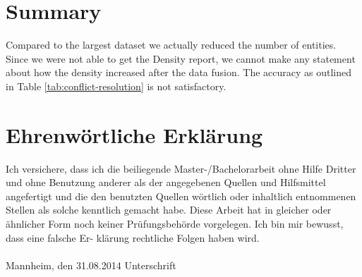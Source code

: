 \documentclass[11pt,titlepage,oneside,openany]{article}
\begin{document}
\section{Summary}
Compared to the largest dataset we actually reduced the number of entities. Since we were not able to get the Density report, we cannot make any statement about how the density increased after the data fusion. The accuracy as outlined in Table \ref{tab:conflict-resolution} is not satisfactory.





\appendix


\newpage


\pagestyle{empty}


\section*{Ehrenw\"ortliche Erkl\"arung}
Ich versichere, dass ich die beiliegende Master-/Bachelorarbeit ohne Hilfe Dritter
und ohne Benutzung anderer als der angegebenen Quellen und Hilfsmittel
angefertigt und die den benutzten Quellen w\"ortlich oder inhaltlich
entnommenen Stellen als solche kenntlich gemacht habe. Diese Arbeit
hat in gleicher oder \"ahnlicher Form noch keiner Pr\"ufungsbeh\"orde
vorgelegen. Ich bin mir bewusst, dass eine falsche Er- kl\"arung rechtliche Folgen haben
wird.
\\
\\

\noindent
Mannheim, den 31.08.2014 \hspace{4cm} Unterschrift
\end{document}
